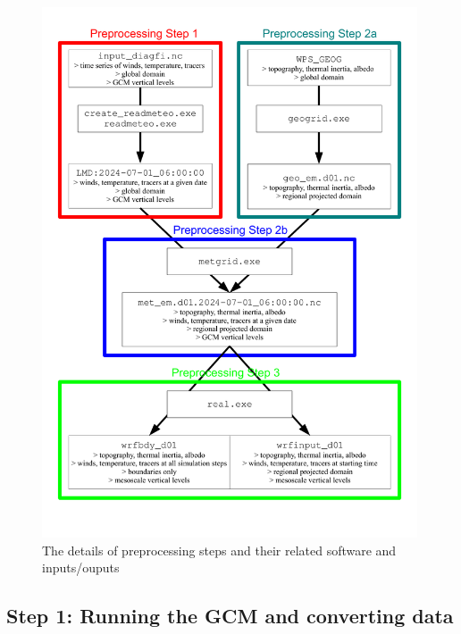 \begin{center}
\begin{figure}[p] 
\includegraphics[width=0.99\textwidth]{diagramme.pdf} 
\caption{\label{preproc} The details of preprocessing steps and their related software and inputs/ouputs}
\end{figure}
\end{center}

\subsection{Step 1: Running the GCM and converting data}\label{gcmini}

